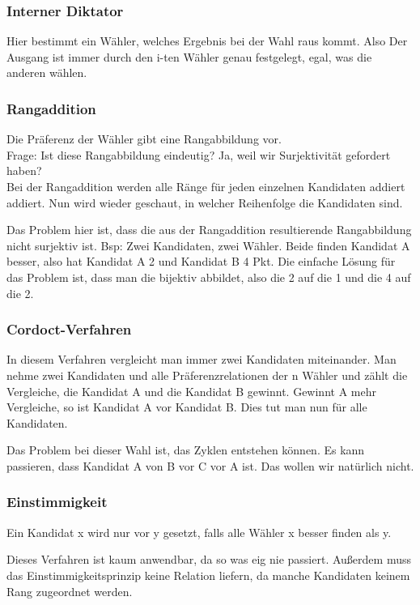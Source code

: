 \documentclass[]{article}
\begin{document}
\subsubsection*{Interner Diktator}
Hier bestimmt ein Wähler, welches Ergebnis bei der Wahl raus kommt. Also Der Ausgang ist immer durch den i-ten Wähler genau festgelegt, egal, was die anderen wählen.

\subsubsection*{Rangaddition}
Die Präferenz der Wähler gibt eine Rangabbildung vor. \\

Frage: Ist diese Rangabbildung eindeutig? Ja, weil wir Surjektivität gefordert haben? \\

Bei der Rangaddition werden alle Ränge für jeden einzelnen Kandidaten addiert addiert. Nun wird wieder geschaut, in welcher Reihenfolge die Kandidaten sind. 

Das Problem hier ist, dass die aus der Rangaddition resultierende Rangabbildung nicht surjektiv ist. Bsp: Zwei Kandidaten, zwei Wähler. Beide finden Kandidat A besser, also hat Kandidat A 2 und Kandidat B 4 Pkt. Die einfache Lösung für das Problem ist, dass man die bijektiv abbildet, also die 2 auf die 1 und die 4 auf die 2. 

\subsubsection*{Cordoct-Verfahren}
 In diesem Verfahren vergleicht man immer zwei Kandidaten miteinander. Man nehme zwei Kandidaten und alle Präferenzrelationen der n Wähler und zählt die Vergleiche, die Kandidat A und die Kandidat B gewinnt. Gewinnt A mehr Vergleiche, so ist Kandidat A vor Kandidat B. Dies tut man nun für alle Kandidaten.
 
 Das Problem bei dieser Wahl ist, das Zyklen entstehen können. Es kann passieren, dass Kandidat A von B vor C vor A ist. Das wollen wir natürlich nicht.
 
\subsubsection*{Einstimmigkeit}
 Ein Kandidat x wird nur vor y gesetzt, falls alle Wähler x besser finden als y. 
 
 Dieses Verfahren ist kaum anwendbar, da so was eig nie passiert. Außerdem muss das Einstimmigkeitsprinzip keine Relation liefern, da manche Kandidaten keinem Rang zugeordnet werden. 
 
\end{document}
